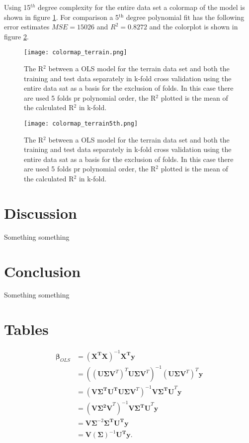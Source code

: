 \documentclass[uio,jmp,amsmath,amssymb,reprint,nofootinbib]{revtex4-1}
\numberwithin{equation}{section}
\begin{document}
Using 15\(^{th}\) degree complexity for the entire data set a colormap of the model is shown in figure \ref{fig:colormap_terrain_model}. For comparison a 5\(^\text{th}\) degree polynomial fit has the following error estimates \(MSE = 15026\) and \(R^2 = 0.8272\) and the colorplot is shown in figure \ref{fig:colormap_terrain_model5th}.

\begin{figure}[H]
    \centering
    \texttt{[image: colormap\_terrain.png]}
    \caption{The R\(^2\) between a OLS model for the terrain data set and both the training and test data separately in k-fold cross validation using the entire data sat as a basis for the exclusion of folds. In this case there are used 5 folds pr polynomial order, the R\(^2\) plotted is the mean of the calculated R\(^2\) in k-fold.}
    \label{fig:colormap_terrain_model}
\end{figure}

\begin{figure}[H]
    \centering
    \texttt{[image: colormap\_terrain5th.png]}
    \caption{The R\(^2\) between a OLS model for the terrain data set and both the training and test data separately in k-fold cross validation using the entire data sat as a basis for the exclusion of folds. In this case there are used 5 folds pr polynomial order, the R\(^2\) plotted is the mean of the calculated R\(^2\) in k-fold.}
    \label{fig:colormap_terrain_model5th}
\end{figure}

\section{Discussion}\label{sec:Discussion}

Something something

\section{Conclusion}\label{sec:Conclusion}

Something something


\appendix

\section{Tables}

\begin{align*}
\bm{\beta}_{OLS} &= (\bm{X^TX})^{-1}\bm{X^Ty}\\
&= ((\bm{U\Sigma V}^T)^T\bm{U\Sigma V}^T)^{-1}(\bm{U\Sigma V}^T)^T\bm{y}\\
&= (\bm{V\Sigma^TU^T}\bm{U\Sigma V}^T)^{-1}\bm{V\Sigma^TU}^T\bm{y}\\
&= (\bm{V\Sigma^2V}^T)^{-1}\bm{V\Sigma^TU}^T\bm{y}\\
&= \bm{V}\bm{\Sigma}^{-2}\bm{\Sigma^TU^Ty}\\
&= \bm{V}(\bm{\Sigma})^{-1}\bm{U^Ty}.
\end{align*}
\end{document}
